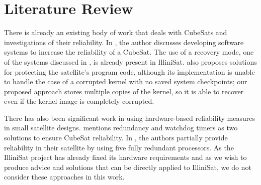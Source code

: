 \section{Literature Review}

There is already an existing body of work that deals with CubeSats and
investigations of their reliability.  In \cite{odegaard2013error}, the author
discusses developing software systems to increase the reliability of a CubeSat.
The use of a recovery mode, one of the systems discussed in
\cite{odegaard2013error}, is already present in IlliniSat.
\cite{odegaard2013error} also proposes solutions for protecting the satellite's
program code, although its implementation is unable to handle the case of a
corrupted kernel with no saved system checkpoints; our proposed approach stores
multiple copies of the kernel, so it is able to recover even if the kernel image
is completely corrupted.

There has also been significant work in using hardware-based reliability measures in small satellite designs.  \cite{toorian2008cubesat} mentions redundancy and watchdog timers as two solutions to ensure CubeSat reliability.  In \cite{passerone2008design}, the authors partially provide reliability in their satellite by using five fully redundant processors.   As the IlliniSat project has already fixed its hardware requirements and as we wish to produce advice and solutions that can be directly applied to IlliniSat, we do not consider these approaches in this work.
